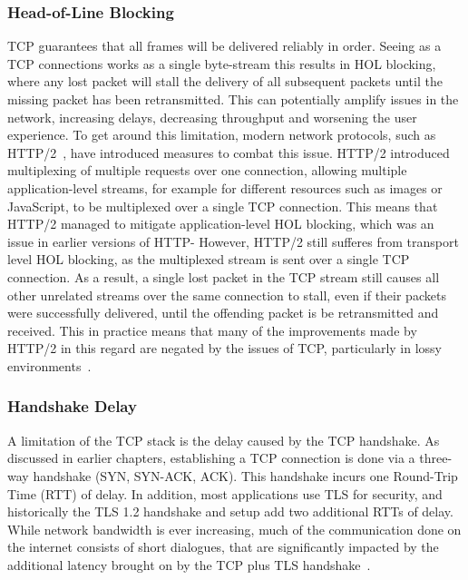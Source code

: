 \documentclass[english, 12pt, a4paper, elec, utf8, a-2b, online]{aaltothesis}
\begin{document}
\subsubsection{Head-of-Line Blocking}
\label{sec:hol}
TCP guarantees that all frames will be delivered reliably in order. Seeing
as a TCP connections works as a single byte-stream this results in HOL blocking,
where any lost packet will stall the delivery of
all subsequent packets until the missing packet has been retransmitted. This
can potentially amplify issues in the network, increasing delays, decreasing
throughput and worsening the user experience. To get around this limitation, modern
network protocols, such as HTTP/2~\cite{rfc9113}, have introduced measures to
combat this issue. HTTP/2 introduced multiplexing of multiple requests over one
connection, allowing multiple application-level streams, for example for different
resources such as images or JavaScript, to be multiplexed over a single TCP
connection. This means that HTTP/2 managed to mitigate application-level HOL
blocking, which was an issue in earlier versions of HTTP- However, HTTP/2 still
sufferes from transport level HOL blocking, as the multiplexed stream is
sent over a single TCP connection. As a result, a single lost packet in the TCP
stream still causes all other unrelated streams over the same connection to stall,
even if their packets were successfully delivered, until the offending packet
is be retransmitted and received. This in practice means that many of the improvements made
by HTTP/2 in this regard are negated by the issues of TCP, particularly in lossy
environments~\cite{http2_vs_1}.

\subsubsection{Handshake Delay}
A limitation of the TCP stack is the delay caused by the TCP handshake. As discussed
in earlier chapters, establishing a TCP connection is done via a three-way handshake
(SYN, SYN-ACK, ACK). This handshake incurs one Round-Trip Time (RTT) of delay. In
addition, most applications use TLS for security, and historically the TLS 1.2 handshake
and setup add two additional RTTs of delay. While network bandwidth is ever increasing,
much of the communication done on the internet consists of short dialogues, that
are significantly impacted by the additional latency brought on by the TCP plus TLS
handshake~\cite{quic_transport_protocol_design}.
\end{document}
